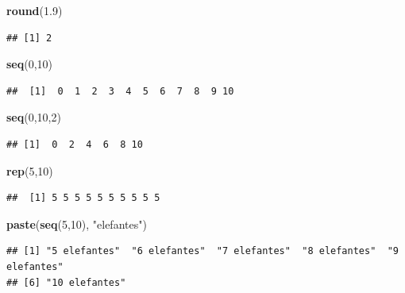 \documentclass[
]{book}
\newenvironment{Shaded}{\begin{snugshade}}{\end{snugshade}}
\newcommand{\DecValTok}[1]{\textcolor[rgb]{0.00,0.00,0.81}{#1}}
\newcommand{\FloatTok}[1]{\textcolor[rgb]{0.00,0.00,0.81}{#1}}
\newcommand{\FunctionTok}[1]{\textcolor[rgb]{0.13,0.29,0.53}{\textbf{#1}}}
\newcommand{\NormalTok}[1]{#1}
\newcommand{\StringTok}[1]{\textcolor[rgb]{0.31,0.60,0.02}{#1}}
\begin{document}
\begin{Shaded}
\begin{Highlighting}[]
\FunctionTok{round}\NormalTok{(}\FloatTok{1.9}\NormalTok{)}
\end{Highlighting}
\end{Shaded}

\begin{verbatim}
## [1] 2
\end{verbatim}

\begin{Shaded}
\begin{Highlighting}[]
\FunctionTok{seq}\NormalTok{(}\DecValTok{0}\NormalTok{,}\DecValTok{10}\NormalTok{)}
\end{Highlighting}
\end{Shaded}

\begin{verbatim}
##  [1]  0  1  2  3  4  5  6  7  8  9 10
\end{verbatim}

\begin{Shaded}
\begin{Highlighting}[]
\FunctionTok{seq}\NormalTok{(}\DecValTok{0}\NormalTok{,}\DecValTok{10}\NormalTok{,}\DecValTok{2}\NormalTok{)}
\end{Highlighting}
\end{Shaded}

\begin{verbatim}
## [1]  0  2  4  6  8 10
\end{verbatim}

\begin{Shaded}
\begin{Highlighting}[]
\FunctionTok{rep}\NormalTok{(}\DecValTok{5}\NormalTok{,}\DecValTok{10}\NormalTok{)}
\end{Highlighting}
\end{Shaded}

\begin{verbatim}
##  [1] 5 5 5 5 5 5 5 5 5 5
\end{verbatim}

\begin{Shaded}
\begin{Highlighting}[]
\FunctionTok{paste}\NormalTok{(}\FunctionTok{seq}\NormalTok{(}\DecValTok{5}\NormalTok{,}\DecValTok{10}\NormalTok{), }\StringTok{"elefantes"}\NormalTok{)}
\end{Highlighting}
\end{Shaded}

\begin{verbatim}
## [1] "5 elefantes"  "6 elefantes"  "7 elefantes"  "8 elefantes"  "9 elefantes" 
## [6] "10 elefantes"
\end{verbatim}
\end{document}
